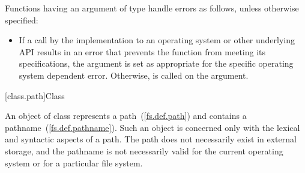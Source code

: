 \pnum
Functions having an argument of type 
handle errors as follows, unless otherwise specified:
\begin{itemize}
\item If a call by the
  implementation to an operating system or other underlying API results in an
  error that prevents the function from meeting its specifications, the
   argument is set as
  appropriate for the specific operating system dependent error. Otherwise, 
  is called on the
   argument.
\end{itemize}

[class.path]{Class }

%
\pnum
An object of class  represents a path~(\ref{fs.def.path})
and contains a pathname~(\ref{fs.def.pathname}).
Such an object is concerned only with the lexical and syntactic aspects
of a path. The path does not necessarily exist in external storage, and the
pathname is not necessarily valid for the current operating
system or for a particular file system.

